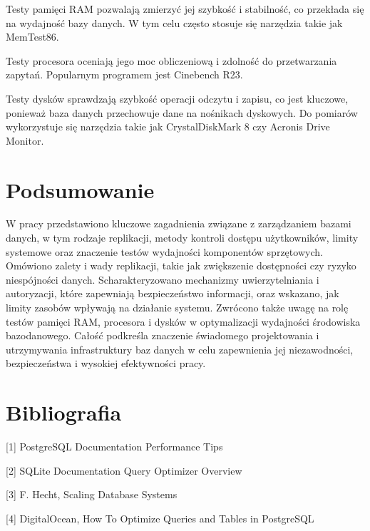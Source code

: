 \documentclass[a4paper,11pt,openany,english]{sphinxmanual}
\begin{document}
\sphinxAtStartPar
Testy pamięci RAM pozwalają zmierzyć jej szybkość i stabilność, co przekłada się na wydajność bazy danych. W tym celu często stosuje się narzędzia takie jak MemTest86.

\sphinxAtStartPar
Testy procesora oceniają jego moc obliczeniową i zdolność do przetwarzania zapytań. Popularnym programem jest Cinebench R23.

\sphinxAtStartPar
Testy dysków sprawdzają szybkość operacji odczytu i zapisu, co jest kluczowe, ponieważ baza danych przechowuje dane na nośnikach dyskowych. Do pomiarów wykorzystuje się narzędzia takie jak CrystalDiskMark 8 czy Acronis Drive Monitor.


\section{Podsumowanie}
\label{\detokenize{rozdzial2/index:podsumowanie}}
\sphinxAtStartPar
W pracy przedstawiono kluczowe zagadnienia związane z zarządzaniem bazami danych, w tym rodzaje replikacji, metody kontroli dostępu użytkowników, limity systemowe oraz znaczenie testów wydajności komponentów sprzętowych. Omówiono zalety i wady replikacji, takie jak zwiększenie dostępności czy ryzyko niespójności danych. Scharakteryzowano mechanizmy uwierzytelniania i autoryzacji, które zapewniają bezpieczeństwo informacji, oraz wskazano, jak limity zasobów wpływają na działanie systemu. Zwrócono także uwagę na rolę testów pamięci RAM, procesora i dysków w optymalizacji wydajności środowiska bazodanowego. Całość podkreśla znaczenie świadomego projektowania i utrzymywania infrastruktury baz danych w celu zapewnienia jej niezawodności, bezpieczeństwa i wysokiej efektywności pracy.


\section{Bibliografia}
\label{\detokenize{rozdzial2/index:bibliografia}}
\sphinxAtStartPar
{[}1{]} PostgreSQL Documentation \textendash{} Performance Tips

\sphinxAtStartPar
{[}2{]} SQLite Documentation \textendash{} Query Optimizer Overview

\sphinxAtStartPar
{[}3{]} F. Hecht, Scaling Database Systems

\sphinxAtStartPar
{[}4{]} DigitalOcean, How To Optimize Queries and Tables in PostgreSQL
\end{document}
